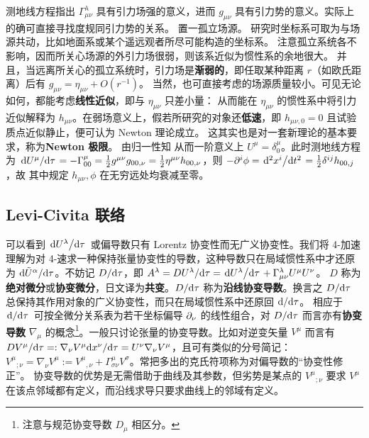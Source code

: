 测地线方程指出 $\Gamma^{\lambda}_{\mu\nu}$ 具有引力场强的意义，进而 $g_{\mu\nu}$ 具有引力势的意义。实际上的确可直接寻找度规同引力势的关系。
置一孤立场源。
研究时坐标系可取为与场源共动，比如地面系或某个遥远观者所尽可能构造的坐标系。
注意孤立系统各不影响，因而所关心场源的外引力场很弱，则该系近似为惯性系的余地很大。
并且，当远离所关心的孤立系统时，引力场是\textbf{渐弱的}，即任取某种距离 $r$（如欧氏距离）后有 $g_{\mu\nu}=\eta_{\mu\nu}+O(r^{-1})$。
当然，也可直接考虑的场源质量较小。可见无论如何，都能考虑\textbf{线性近似}，即与 $\eta_{\mu\nu}$ 只差小量：
从而能在 $\eta_{\mu\nu}$ 的惯性系中将引力近似解释为 $h_{\mu\nu}$。在弱场意义上，假若所研究的对象还\textbf{低速}，即 $h_{\mu\nu,0}=0$ 且试验质点近似静止，便可认为 Newton 理论成立。
这其实也是对一套新理论的基本要求，称为\textbf{Newton 极限}。
由归一性知
从而一阶意义上 $U^\mu=\delta^\mu_0$。此时测地线方程为 $\dv*{U^\mu}{\tau}=-\Gamma_{00}^\mu= \frac 12 g^{\mu\nu} g_{00,\nu}=\frac 12 \eta^{\mu\nu} h_{00,\nu}$，则 $-\partial^i\phi=\dv*[2]{x^i}{t}=\frac 12 \delta^{ij} h_{00,j}$，故
其中规定 $h_{\mu\nu},\phi$ 在无穷远处均衰减至零。


\subsection{Levi-Civita 联络}\label{sec:co-di}

可以看到 $\dv*{U^\lambda}{\tau}$ 或偏导数只有 Lorentz 协变性而无广义协变性。我们将 4-加速理解为对 4-速求一种保持张量协变性的导数，这种导数只在局域惯性系中才还原为 ${\dd\tilde U^\alpha}/{\dd\tau}$。不妨记 $D/\dd\tau$，即 $A^\lambda={D U^\lambda}/{\dd\tau}=\dv*{U^\lambda}{\tau}+\Gamma^\lambda_{\mu\nu}U^\mu U^\nu$。
$D$ 称为\textbf{绝对微分}或\textbf{协变微分}，日文译为\textbf{共变}。$D/\dd\tau$ 称为\textbf{沿线协变导数}。换言之 $D/\dd\tau$ 总保持其作用对象的广义协变性，而只在局域惯性系中还原回 $\dd/\dd\tau$。
相应于 $\dv*{\tau}$ 可按全微分关系表为若干坐标偏导 $\partial_\nu$ 的线性组合，对 $D/\dd\tau$ 而言亦有\textbf{协变导数} $\nabla_\mu$ 的概念\footnote{注意与规范协变导数 $D_\mu$ 相区分。}。一般只讨论张量的协变导数。比如对逆变矢量 $V^\mu$ 而言有 ${D V^\mu}/{\dd\tau}=:\nabla_\nu V^\mu {\dd x^\nu}/{\dd \tau}=U^\nu\nabla_\nu V^\mu$，且可有类似的分号简记：$V^\mu{}_{;\nu}=\nabla_\nu V^\mu :={V^\mu}{}_{,\nu}+\Gamma^\mu_{\sigma\nu}V^\sigma$。常把多出的克氏符项称为对偏导数的“协变性修正”。
协变导数的优势是无需借助于曲线及其参数，但劣势是某点的 $ V^\mu{}_{;\nu}$ 要求 $V^\mu$ 在该点邻域都有定义，而沿线求导只要求曲线上的邻域有定义。

